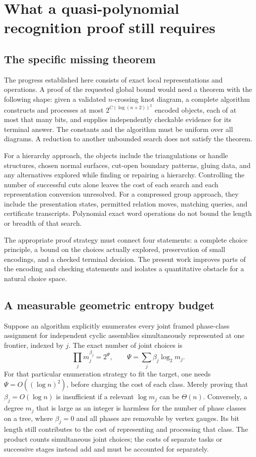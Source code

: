 \section{What a quasi-polynomial recognition proof still requires}
\label{sec:qp}

\subsection{The specific missing theorem}

The progress established here consists of exact local representations and
operations. A proof of the requested global bound would need a theorem with
the following shape: given a validated $n$-crossing knot diagram, a complete
algorithm constructs and processes at most $2^{C(\log(n+2))^2}$ encoded
objects, each of at most that many bits, and supplies independently checkable
evidence for its terminal answer. The constants and the algorithm must be
uniform over all diagrams. A reduction to another unbounded search does not
satisfy the theorem.

For a hierarchy approach, the objects include the triangulations or handle
structures, chosen normal surfaces, cut-open boundary patterns, gluing data,
and any alternatives explored while finding or repairing a hierarchy.
Controlling the number of successful cuts alone leaves the cost of each
search and each representation conversion unresolved. For a compressed group
approach, they include the presentation states, permitted relation moves,
matching queries, and certificate transcripts. Polynomial exact word
operations do not bound the length or breadth of that search.

The appropriate proof strategy must connect four statements: a complete
choice principle, a bound on the choices actually explored, preservation of
small encodings, and a checked terminal decision. The present work improves
parts of the encoding and checking statements and isolates a quantitative
obstacle for a natural choice space.

\subsection{A measurable geometric entropy budget}

Suppose an algorithm explicitly enumerates every joint framed phase-class
assignment for independent cyclic assemblies simultaneously represented at
one frontier, indexed by $j$. The exact number of joint choices is
\[
 \prod_j m_j^{\beta_j}
 =2^{\Psi},\qquad
 \Psi=\sum_j\beta_j\log_2m_j.
\]
For that particular enumeration strategy to fit the target, one needs
$\Psi=O((\log n)^2)$, before charging the cost of each class. Merely
proving that $\beta_j=O(\log n)$ is insufficient if a relevant
$\log m_j$ can be $\Theta(n)$. Conversely, a degree $m_j$ that is large
as an integer is harmless for the number of phase classes on a tree, where
$\beta_j=0$ and all phases are removable by vertex gauges. Its bit length
still contributes to the cost of representing and processing that class.
The product counts simultaneous joint choices; the costs of separate tasks
or successive stages instead add and must be accounted for separately.

